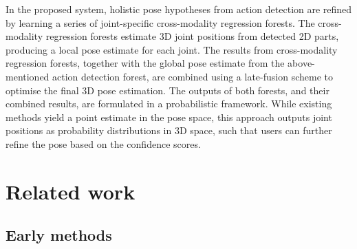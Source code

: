 In the proposed system, holistic pose hypotheses from action detection are refined by learning a series of joint-specific cross-modality regression forests. 
The cross-modality regression forests estimate 3D joint positions from detected 2D parts, producing a local pose estimate for each joint. 
The results from cross-modality regression forests, together with the global pose estimate from the above-mentioned action detection forest, are combined using a late-fusion scheme to optimise the final 3D pose estimation. 
The outputs of both forests, and their combined results, are formulated in a probabilistic framework. While existing methods yield a point estimate in the pose space, this approach outputs joint positions as probability distributions in 3D space, such that users can further refine the pose based on the confidence scores.  


\section{Related work}
\label{sec/body/review}

\subsection{Early methods} 

